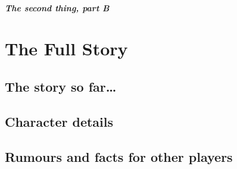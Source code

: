 \lipsum[5]

\subsubsection{The second thing, part B}

\lipsum[6]

\part{The Full Story}

\chapter{The story so far\ldots}



\chapter{Character details}

\lipsum[7]

\chapter{Rumours and facts for other players}

\lipsum[8]


